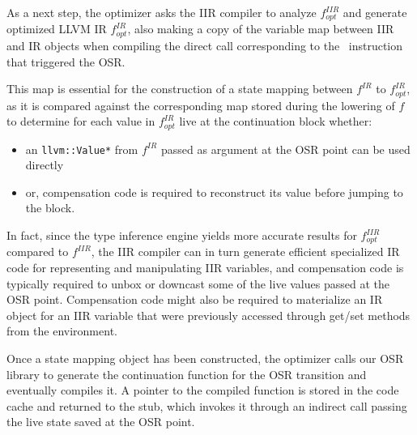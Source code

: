As a next step, the optimizer asks the IIR compiler to analyze $f^{IIR}_{opt}$ and generate optimized LLVM IR $f^{IR}_{opt}$, also making a copy of the variable map between IIR and IR objects when compiling the direct call corresponding to the \feval\ instruction that triggered the OSR.

This map is essential for the construction of a state mapping between $f^{IR}$ to $f^{IR}_{opt}$, as it is compared against the corresponding map stored during the lowering of $f$ to determine for each value in $f^{IR}_{opt}$ live at the continuation block whether:
\begin{itemize}
\item an {\tt llvm::Value*} from $f^{IR}$ passed as argument at the OSR point can be used directly
\item or, compensation code is required to reconstruct its value before jumping to the block.
\end{itemize}

\noindent In fact, since the type inference engine yields more accurate results for $f^{IIR}_{opt}$ compared to $f^{IIR}$, the IIR compiler can in turn generate efficient specialized IR code for representing and manipulating IIR variables, and compensation code is typically required to unbox or downcast some of the live values passed at the OSR point. Compensation code might also be required to materialize an IR object for an IIR variable that were previously accessed through get/set methods from the environment.

Once a state mapping object has been constructed, the optimizer calls our OSR library to generate the continuation function for the OSR transition and eventually compiles it. A pointer to the compiled function is stored in the code cache and returned to the stub, which invokes it through an indirect call passing the live state saved at the OSR point.
